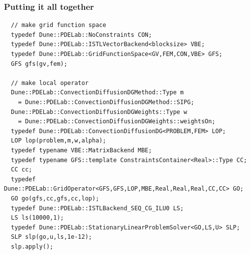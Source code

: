 \begin{frame}[fragile]
  \frametitle{Putting it all together}
  \scriptsize
  \begin{lstlisting}
  // make grid function space
  typedef Dune::PDELab::NoConstraints CON;
  typedef Dune::PDELab::ISTLVectorBackend<blocksize> VBE;
  typedef Dune::PDELab::GridFunctionSpace<GV,FEM,CON,VBE> GFS;
  GFS gfs(gv,fem);

  // make local operator
  Dune::PDELab::ConvectionDiffusionDGMethod::Type m
    = Dune::PDELab::ConvectionDiffusionDGMethod::SIPG;
  Dune::PDELab::ConvectionDiffusionDGWeights::Type w
    = Dune::PDELab::ConvectionDiffusionDGWeights::weightsOn;
  typedef Dune::PDELab::ConvectionDiffusionDG<PROBLEM,FEM> LOP;
  LOP lop(problem,m,w,alpha);
  typedef typename VBE::MatrixBackend MBE;
  typedef typename GFS::template ConstraintsContainer<Real>::Type CC;
  CC cc;
  typedef Dune::PDELab::GridOperator<GFS,GFS,LOP,MBE,Real,Real,Real,CC,CC> GO;
  GO go(gfs,cc,gfs,cc,lop);
  typedef Dune::PDELab::ISTLBackend_SEQ_CG_ILU0 LS;
  LS ls(10000,1);
  typedef Dune::PDELab::StationaryLinearProblemSolver<GO,LS,U> SLP;
  SLP slp(go,u,ls,1e-12);
  slp.apply();
  \end{lstlisting}
\end{frame}



